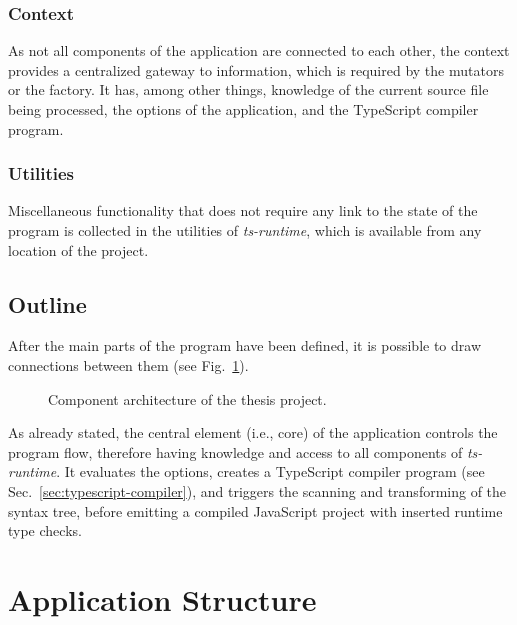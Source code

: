 \subsubsection{Context}

As not all components of the application are connected to each other, the context provides a centralized gateway to information, which is required by the mutators or the factory. It has, among other things, knowledge of the current source file being processed, the options of the application, and the TypeScript compiler program.

\subsubsection{Utilities}

Miscellaneous functionality that does not require any link to the state of the program is collected in the utilities of \emph{ts-runtime}, which is available from any location of the project.

\subsection{Outline}

After the main parts of the program have been defined, it is possible to draw connections between them (see Fig.~\ref{fig:architecture}).
\begin{figure}
\centering

\caption{Component architecture of the thesis project.}
\label{fig:architecture}
\end{figure}
As already stated, the central element (i.e., core) of the application controls the program flow, therefore having knowledge and access to all components of \emph{ts-runtime}. It evaluates the options, creates a TypeScript compiler program (see Sec.~\ref{sec:typescript-compiler}), and triggers the scanning and transforming of the syntax tree, before emitting a compiled JavaScript project with inserted runtime type checks. 

\section{Application Structure}
\label{sec:structure}

